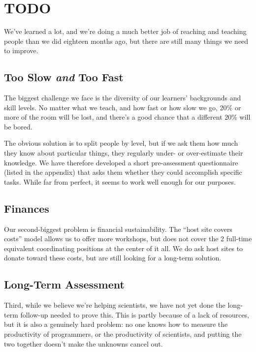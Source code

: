 \documentclass[10pt,a4paper,twocolumn]{article}
\begin{document}
\section*{TODO}

We've learned a lot, and we're doing a much better job of reaching and
teaching people than we did eighteen months ago, but there are still
many things we need to improve.

\subsection*{Too Slow \emph{and} Too Fast}

The biggest challenge we face is the diversity of our learners'
backgrounds and skill levels. No matter what we teach, and how fast or
how slow we go, 20\% or more of the room will be lost, and there's a
good chance that a different 20\% will be bored.

The obvious solution is to split people by level, but if we ask them
how much they know about particular things, they regularly under- or
over-estimate their knowledge.  We have therefore developed a short
pre-assessment questionnaire (listed in the appendix) that asks them
whether they could accomplish specific tasks.  While far from perfect,
it seems to work well enough for our purposes.

\subsection*{Finances}

Our second-biggest problem is financial sustainability. The ``host
site covers costs'' model allows us to offer more workshops, but does
not cover the 2 full-time equivalent coordinating positions at the
center of it all.  We do ask host sites to donate toward these costs,
but are still looking for a long-term solution.

\subsection*{Long-Term Assessment}

Third, while we believe we're helping scientists, we have not yet done
the long-term follow-up needed to prove this. This is partly because of
a lack of resources, but it is also a genuinely hard problem: no one
knows how to measure the productivity of programmers, or the
productivity of scientists, and putting the two together doesn't make
the unknowns cancel out.
\end{document}
